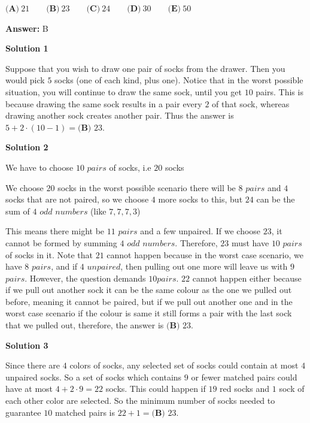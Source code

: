 \begin{enumerate}
 $\textbf{(A)}\ 21\qquad \textbf{(B)}\ 23\qquad \textbf{(C)}\ 24\qquad \textbf{(D)}\ 30\qquad \textbf{(E)}\ 50$

 \textbf{Answer: }B



\textbf{Solution 1}


Suppose that you wish to draw one pair of socks from the drawer. Then you would pick $5$ socks (one of each kind, plus one). Notice that in the worst possible situation, you will continue to draw the same sock, until you get $10$ pairs. This is because drawing the same sock results in a pair every $2$ of that sock, whereas drawing another sock creates another pair. Thus the answer is $5+2\cdot(10-1) = \boxed{\textbf{(B) } 23}$.

 



\textbf{Solution 2}

We have to choose $10$ $pairs$ of socks, i.e $20$ socks

 We choose $20$ socks in the worst possible scenario there will be $8$ $pairs$ and $4$ socks that are not paired, so we choose $4$ more socks to this, but $24$ can be the sum of $4$ $odd$ $numbers$ (like $7,7,7,3$)

 This means there might be $11$ $pairs$ and a few unpaired. If we choose $23$, it cannot be formed by summing $4$ $odd$ $numbers$. Therefore, $23$ must have $10$ $pairs$ of socks in it. Note that $21$ cannot happen because in the worst case scenario, we have $8$ $pairs$, and if $4$ $unpaired$, then pulling out one more will leave us with $9$ $pairs$. However, the question demands $10 pairs$. $22$ cannot happen either because if we pull out another sock it can be the same colour as the one we pulled out before, meaning it cannot be paired, but if we pull out another one and in the worst case scenario if the colour is same it still forms a pair with the last sock that we pulled out, therefore, the answer is $\boxed{\textbf{(B) } 23}$.

 



\textbf{Solution 3}

Since there are $4$ colors of socks, any selected set of socks could contain at most $4$ unpaired socks.  So a set of socks which contains $9$ or fewer matched pairs could have at most $4 + 2 \cdot 9 = 22$ socks.  This could happen if $19$ red socks and $1$ sock of each other color are selected.  So the minimum number of socks needed to guarantee $10$ matched pairs is $22 + 1 = \boxed{\textbf{(B) } 23}$.


\end{enumerate}
